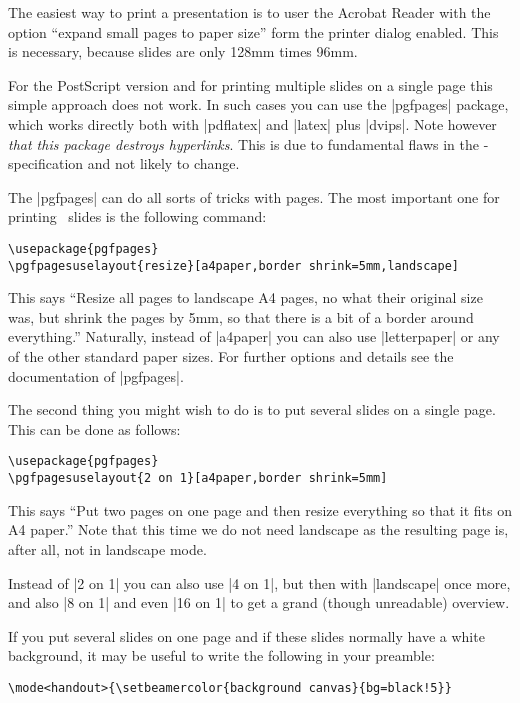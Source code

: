 The easiest way to print a presentation is to user the Acrobat Reader
with the option ``expand small pages to paper size'' form the printer
dialog enabled. This is necessary, because slides are only 128mm times
96mm.

For the PostScript version and for printing multiple slides on a
single page this simple approach does not work. In such cases you can
use the |pgfpages| package, which works directly both with |pdflatex|
and |latex| plus |dvips|. Note however \emph{that this package
  destroys hyperlinks}. This is due to fundamental flaws in the
\pdf-specification and not likely to change.

The |pgfpages| can do all sorts of tricks with pages. The most
important one for printing \beamer\ slides is the following command:

\begin{verbatim}
\usepackage{pgfpages}
\pgfpagesuselayout{resize}[a4paper,border shrink=5mm,landscape]
\end{verbatim}

This says ``Resize all pages to landscape A4 pages, no what their
original size was, but shrink the pages by 5mm, so that there is a bit
of a border around everything.'' Naturally, instead of |a4paper| you
can also use |letterpaper| or any of the other standard paper
sizes. For further options and details see the documentation of
|pgfpages|.

The second thing you might wish to do is to put several slides on a
single page. This can be done as follows:

\begin{verbatim}
\usepackage{pgfpages}
\pgfpagesuselayout{2 on 1}[a4paper,border shrink=5mm]
\end{verbatim}

This says ``Put two pages on one page and then resize everything so
that it fits on A4 paper.'' Note that this time we do not need
landscape as the resulting page is, after all, not in landscape mode.

Instead of |2 on 1| you can also use |4 on 1|, but then with
|landscape| once more, and also |8 on 1| and even |16 on 1| to get a
grand (though unreadable) overview.

If you put several slides on one page and if these slides normally
have a white background, it may be useful to write the following in
your preamble:

\begin{verbatim}
\mode<handout>{\setbeamercolor{background canvas}{bg=black!5}}
\end{verbatim}

